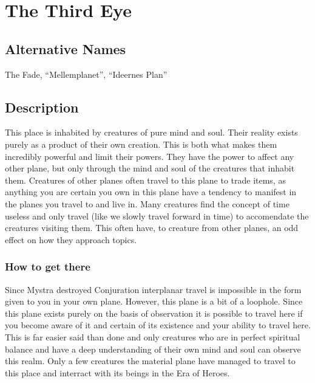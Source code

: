 \section*{The Third Eye}

\subsection*{Alternative Names}
The Fade, \enquote{Mellemplanet}, \enquote{Ideernes Plan}

\subsection*{Description}
This place is inhabited by creatures of pure mind and soul. Their reality exists purely as a product of their own creation. This is both what makes them incredibly powerful and limit their powers. They have the power to affect any other plane, but only through the mind and soul of the creatures that inhabit them. Creatures of other planes often travel to this plane to trade items, as anything you are certain you own in this plane have a tendency to manifest in the planes you travel to and live in. Many creatures find the concept of time useless and only travel (like we slowly travel forward in time) to accomendate the creatures visiting them. This often have, to creature from other planes, an odd effect on how they approach topics.

\subsubsection*{How to get there}
Since Mystra destroyed Conjuration interplanar travel is impossible in the form given to you in your own plane. However, this plane is a bit of a loophole. Since this plane exists purely on the basis of observation it is possible to travel here if you become aware of it and certain of its existence and your ability to travel here. This is far easier said than done and only creatures who are in perfect spiritual balance and have a deep understanding of their own mind and soul can observe this realm. Only a few creatures the material plane have managed to travel to this place and interract with its beings in the Era of Heroes.